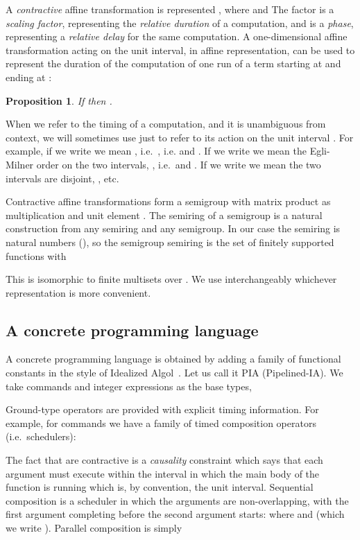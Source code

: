 \documentclass{article}
\newtheorem{proposition}[theorem]{Proposition}
\begin{document}
A \emph{contractive} affine transformation is represented
, where   and 
The factor  is a \emph{scaling factor}, representing the \emph{relative duration}
of a computation, and  is a \emph{phase}, representing a \emph{relative delay} for the same  computation. A one-dimensional affine transformation acting on the unit interval, in affine representation, can be used to represent the duration of the computation of one run of a term starting at  and ending at :


\begin{proposition}
If  then . 
\end{proposition}

When we refer to the timing of a computation, and it is unambiguous from context, we will sometimes use just  to refer to its action on the unit interval . For example, if we write  we mean , i.e.\   , i.e.  and .  If we write  we mean the Egli-Milner order on the two intervals, , i.e.\    and .  If we write  we mean the two intervals are disjoint, , etc.

Contractive affine transformations form a semigroup with matrix product as multiplication and unit element
.
The semiring of a semigroup  is  a natural construction from any semiring and any semigroup. In our case the semiring is natural numbers (), so the semigroup semiring is the set of finitely supported functions  with 

This is isomorphic to finite multisets over . We use interchangeably whichever representation is more convenient. 

\subsection{A concrete programming language}

A concrete programming language is obtained by adding a family of functional constants in the style of Idealized Algol~\cite{reynolds1997essence}. Let us call it PIA (Pipelined-IA). We take commands and integer expressions as the base types, 


Ground-type operators are provided with explicit timing information. For example, for commands we have a family of timed composition operators (i.e.\ schedulers):

The fact that  are contractive is a \emph{causality} constraint which says that each argument must execute within the interval in which the main body of the function is running which is, by convention, the unit interval. Sequential composition is a scheduler in which the arguments are non-overlapping, with the first argument completing before the second argument starts:
 where  and  (which we write ). Parallel composition is simply
\end{document}
